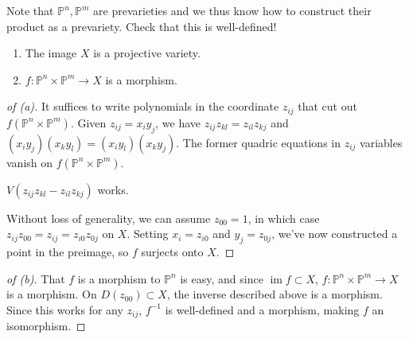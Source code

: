 Note that \({\mathbb{P}}^n, {\mathbb{P}}^m\) are prevarieties and we
thus know how to construct their product as a prevariety. Check that
this is well-defined!

\begin{proposition}

\envlist

\begin{enumerate}
\def\labelenumi{\alph{enumi}.}
\item
  The image \(X\) is a projective variety.
\item
  \(f: {\mathbb{P}}^n \times{\mathbb{P}}^m \to X\) is a morphism.
\end{enumerate}

\end{proposition}

\begin{proof}[of (a)]

It suffices to write polynomials in the coordinate \(z_{ij}\) that cut
out \(f({\mathbb{P}}^n \times{\mathbb{P}}^m)\). Given
\(z_{ij} = x_i y_j\), we have \(z_{ij} z_{kl} = z_{il} z_{kj}\) and
\((x_i y_j)(x_k y_l) = (x_i y_l)(x_k y_j)\). The former quadric
equations in \(z_{ij}\) variables vanish on
\(f({\mathbb{P}}^n \times{\mathbb{P}}^m)\).

\begin{claim}

\(V(z_{ij} z_{kl} - z_{il} z_{kj})\) works.

\end{claim}

Without loss of generality, we can assume \(z_{00} = 1\), in which case
\(z_{ij} z_{00} = z_{ij} = z_{i0} z_{0j}\) on \(X\). Setting
\(x_i = z_{i0}\) and \(y_j = z_{0j}\), we've now constructed a point in
the preimage, so \(f\) surjects onto \(X\).

\end{proof}

\begin{proof}[of (b)]

That \(f\) is a morphism to \({\mathbb{P}}^n\) is easy, and since
\(\operatorname{im}f \subset X\),
\(f: {\mathbb{P}}^n \times{\mathbb{P}}^m \to X\) is a morphism. On
\(D(z_{00}) \subset X\), the inverse described above is a morphism.
Since this works for any \(z_{ij}\), \(f^{-1}\) is well-defined and a
morphism, making \(f\) an isomorphism.

\end{proof}

